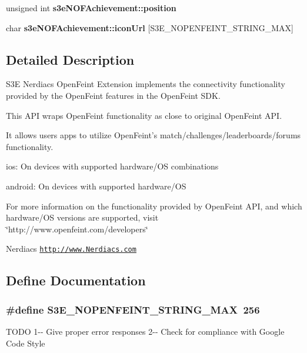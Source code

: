 \begin{DoxyCompactItemize}
\item 
\hypertarget{group___n_open_feint_api_group_gabdadc0c884c55313c7fc0ee1067f4b8a}{
unsigned int {\bfseries s3eNOFAchievement::position}}
\label{group___n_open_feint_api_group_gabdadc0c884c55313c7fc0ee1067f4b8a}

\item 
\hypertarget{group___n_open_feint_api_group_ga3a1eb47a42bd1867f223a1ae7f076b40}{
char {\bfseries s3eNOFAchievement::iconUrl} \mbox{[}S3E\_\-NOPENFEINT\_\-STRING\_\-MAX\mbox{]}}
\label{group___n_open_feint_api_group_ga3a1eb47a42bd1867f223a1ae7f076b40}

\end{DoxyCompactItemize}


\subsection{Detailed Description}
S3E Nerdiacs OpenFeint Extension implements the connectivity functionality provided by the OpenFeint features in the OpenFeint SDK.

This API wraps OpenFeint functionality as close to original OpenFeint API.

It allows users apps to utilize OpenFeint's match/challenges/leaderboards/forums functionality. 
\begin{DoxyItemize}
\item ios: On devices with supported hardware/OS combinations
\item android: On devices with supported hardware/OS
\end{DoxyItemize}

For more information on the functionality provided by OpenFeint API, and which hardware/OS versions are supported, visit \char`\"{}http://www.openfeint.com/developers\char`\"{}

Nerdiacs \href{http://www.Nerdiacs.com}{\tt http://www.Nerdiacs.com} 

\subsection{Define Documentation}
\hypertarget{group___n_open_feint_api_group_ga2a3a66951aa3d2b0cb2eaac82c1ff30c}{
\subsubsection[{S3E\_\-NOPENFEINT\_\-STRING\_\-MAX}]{\setlength{\rightskip}{0pt plus 5cm}\#define S3E\_\-NOPENFEINT\_\-STRING\_\-MAX~256}}
\label{group___n_open_feint_api_group_ga2a3a66951aa3d2b0cb2eaac82c1ff30c}
TODO 1-\/-\/ Give proper error responses 2-\/-\/ Check for compliance with Google Code Style

